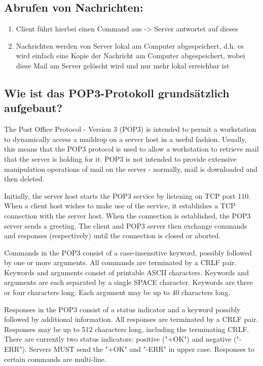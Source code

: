 \documentclass[11pt]{article}
\begin{document}
    \subsection{Abrufen von Nachrichten:}
    \begin{enumerate}

        \item Client führt hierbei einen Command aus -> Server antwortet auf dieses
        \item Nachrichten werden von Server lokal am Computer abgespeichert, d.h. es
        wird einfach eine Kopie der Nachricht am Computer abgespeichert, wobei diese
        Mail am Server gelöscht wird und nur mehr lokal erreichbar ist

    \end{enumerate}
    \subsection{Wie ist das POP3-Protokoll grundsätzlich aufgebaut?}
    The Post Office Protocol - Version 3 (POP3) is intended to
    permit a workstation to dynamically access a maildrop on a server
    host in a useful fashion.  Usually, this means that the POP3 protocol
    is used to allow a workstation to retrieve mail that the server is
    holding for it. POP3 is not intended to provide extensive manipulation operations of
    mail on the server - normally, mail is downloaded and then deleted.

    Initially, the server host starts the POP3 service by listening on
    TCP port 110. When a client host wishes to make use of the service,
    it establishes a TCP connection with the server host.  When the
    connection is established, the POP3 server sends a greeting.  The
    client and POP3 server then exchange commands and responses
    (respectively) until the connection is closed or aborted.

    Commands in the POP3 consist of a case-insensitive keyword, possibly
    followed by one or more arguments.  All commands are terminated by a
    CRLF pair.  Keywords and arguments consist of printable ASCII
    characters.  Keywords and arguments are each separated by a single
    SPACE character.  Keywords are three or four characters long. Each
    argument may be up to 40 characters long.

    Responses in the POP3 consist of a status indicator and a keyword
    possibly followed by additional information.  All responses are
    terminated by a CRLF pair.  Responses may be up to 512 characters
    long, including the terminating CRLF.  There are currently two status
    indicators: positive ("+OK") and negative ("-ERR").  Servers MUST
    send the "+OK" and "-ERR" in upper case. Responses to certain commands are multi-line.
\end{document}
